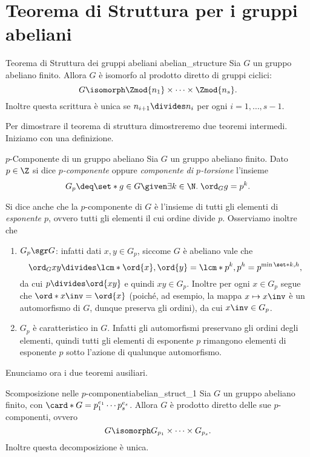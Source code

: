 \section{Teorema di Struttura per i gruppi abeliani}

\begin{theorem}
    {Teorema di Struttura dei gruppi abeliani} 
    {abelian_structure}
    Sia $G$ un gruppo abeliano finito. Allora $G$ è isomorfo al prodotto diretto di gruppi ciclici:
    \begin{equation}
        G \isomorph \Zmod{n_1} \times \cdots \times \Zmod{n_s}.
    \end{equation} Inoltre questa scrittura è unica se $n_{i+1} \divides n_i$ per ogni $i = 1, \dots, s-1$.
\end{theorem}

Per dimostrare il teorema di struttura dimostreremo due teoremi intermedi. Iniziamo con una definizione.

\begin{definition}
    {$p$-Componente di un gruppo abeliano}{} Sia $G$ un gruppo abeliano finito. Dato $p \in \Z$ si dice \emph{$p$-componente} oppure \emph{componente di $p$-torsione} l'insieme \[
        G_p \deq \set*{g \in G \given \exists k \in \N.\; \ord_{G}{g} = p^k}.
    \]
\end{definition}

Si dice anche che la $p$-componente di $G$ è l'insieme di tutti gli elementi di \emph{esponente $p$}, ovvero tutti gli elementi il cui ordine divide $p$.
Osserviamo inoltre che \begin{enumerate}[label={(\arabic*)}]
    \item $G_p \sgr G$: infatti dati $x, y \in G_p$, siccome $G$ è abeliano vale che \[
        \ord_{G}{xy} \divides \lcm*{\ord{x}, \ord{y}} = \lcm*{p^k, p^h} = p^{\min\set*{k, h}},
    \] da cui $p \divides \ord{xy}$ e quindi $xy \in G_p$. Inoltre per ogni $x \in G_p$ segue che $\ord*{x\inv} = \ord{x}$ (poiché, ad esempio, la mappa $x \mapsto x\inv$ è un automorfismo di $G$, dunque preserva gli ordini), da cui $x\inv \in G_p$.
    \item $G_p$ è caratteristico in $G$. Infatti gli automorfismi preservano gli ordini degli elementi, quindi tutti gli elementi di esponente $p$ rimangono elementi di esponente $p$ sotto l'azione di qualunque automorfismo.
\end{enumerate}

Enunciamo ora i due teoremi ausiliari.
\begin{theorem}
    {Scomposizione nelle $p$-componenti}{abelian_struct_1} Sia $G$ un gruppo abeliano finito, con $\card*{G} = p_1^{e_1}\cdots p_s^{e_s}$. Allora $G$ è prodotto diretto delle sue $p$-componenti, ovvero \[
        G \isomorph G_{p_1} \times \cdots \times G_{p_s}.    
    \] Inoltre questa decomposizione è unica.
\end{theorem}

